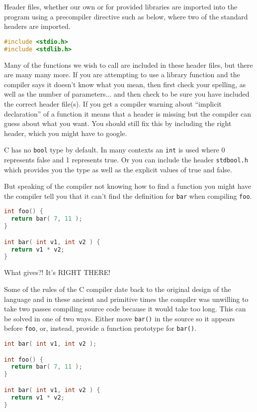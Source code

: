 Header files, whether our own or for provided libraries are imported into the program using a precompiler directive such as below, where two of the standard headers are imported.

\begin{lstlisting}[language=C]
#include <stdio.h>
#include <stdlib.h>
\end{lstlisting}

Many of the functions we wish to call are included in these header files, but there are many many more. If you are attempting to use a library function and the compiler says it doesn't know what you mean, then first check your spelling, as well as the number of parameters... and then check to be sure you have included the correct header file(s). If you get a compiler warning about ``implicit declaration'' of a function it means that a header is missing but the compiler can guess about what you want. You should still fix this by including the right header, which you might have to google.

C has no \texttt{bool} type by default. In many contexts an \texttt{int} is used where 0 represents false and 1 represents true. Or you can include the header \texttt{stdbool.h}  which provides you the type as well as the explicit values of true and false.

But speaking of the compiler not knowing how to find a function you might have the compiler tell you that it can't find the definition for \texttt{bar} when compiling \texttt{foo}.

\begin{lstlisting}[language=C]
int foo() {
  return bar( 7, 11 );
}

int bar( int v1, int v2 ) {
  return v1 * v2;
} 
\end{lstlisting}

What gives?! It's RIGHT THERE!

Some of the rules of the C compiler date back to the original design of the language and in these ancient and primitive times the compiler was unwilling to take two passes compiling source code because it would take too long. This can be solved in one of two ways. Either move \texttt{bar()} in the source so it appears before \texttt{foo}, or, instead, provide a function prototype for \texttt{bar()}.

\begin{lstlisting}[language=C]
int bar( int v1, int v2 );

int foo() {
  return bar( 7, 11 );
}

int bar( int v1, int v2 ) {
  return v1 * v2;
} 
\end{lstlisting}

